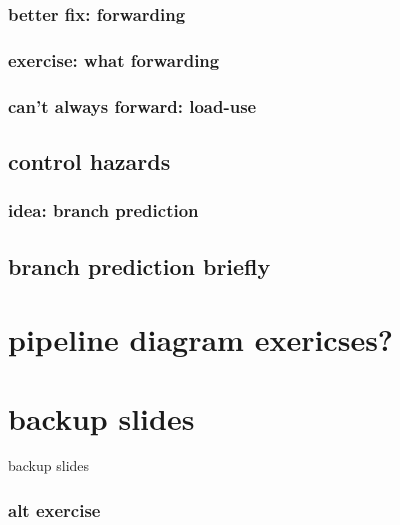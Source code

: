 \subsubsection{better fix: forwarding}


\subsubsection{exercise: what forwarding}


\subsubsection{can't always forward: load-use}


\subsection{control hazards}

\subsubsection{idea: branch prediction}


\subsection{branch prediction briefly}

\section{pipeline diagram exericses?}

\section{backup slides}
\begin{frame}{backup slides}
\end{frame}
\subsubsection{alt exercise}



